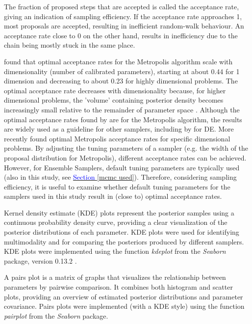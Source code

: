 The fraction of proposed steps that are accepted is called the acceptance rate, giving an indication of sampling efficiency. If the acceptance rate approaches 1, most proposals are accepted, resulting in inefficient random-walk behaviour. An acceptance rate close to 0 on the other hand, results in inefficiency due to the chain being mostly stuck in the same place. 

\cite{gelman1997weak} found that optimal acceptance rates for the Metropolis algorithm scale with dimensionality (number of calibrated parameters), starting at about 0.44 for 1 dimension and decreasing to about 0.23 for highly dimensional problems. The optimal acceptance rate decreases with dimensionality because, for higher dimensional problems, the 'volume' containing posterior density becomes increasingly small relative to the remainder of parameter space \citep{mackay2003information}. Although the optimal acceptance rates found by \cite{gelman1997weak} are for the Metropolis algorithm, the results are widely used as a guideline for other samplers, including by \cite{terbraak2006markov} for DE. More recently \cite{schmon2022optimal} found optimal Metropolis acceptance rates for specific dimensional problems. By adjusting the tuning parameters of a sampler (e.g. the width of the proposal distribution for Metropolis), different acceptance rates can be achieved. However, for Ensemble Samplers, default tuning parameters are typically used (also in this study, see \hyperref[mcmc used]{\textcolor{blue}{Section }\ref{mcmc used}}). Therefore, considering sampling efficiency, it is useful to examine whether default tuning parameters for the samplers used in this study result in (close to) optimal acceptance rates. %

Kernel density estimate (KDE) plots represent the posterior samples using a continuous probability density curve, providing a clear visualization of the posterior distributions of each parameter. KDE plots were used for identifying multimodality and for comparing the posteriors produced by different samplers. %
KDE plots were implemented using the function \textit{kdeplot} from the \textit{Seaborn} package, version 0.13.2 \citep{Waskom2021}.

A pairs plot is a matrix of graphs that visualizes the relationship between parameters by pairwise comparison. It combines both histogram and scatter plots, providing an overview of estimated posterior distributions and parameter covariance. Pairs plots were implemented (with a KDE style) using the function \textit{pairplot} from the \textit{Seaborn} package. %


